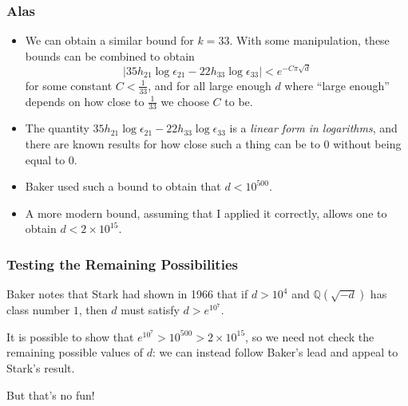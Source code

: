 \documentclass[handout]{beamer}
\begin{document}
\begin{frame}

	\frametitle{Alas}

	\begin{itemize}

		\item We can obtain a similar bound for $k = 33$. With some manipulation, these bounds can be combined to obtain
			\[
				\left| 35 h_{21} \log \epsilon_{21} - 22 h_{33} \log \epsilon_{33} \right| < e^{-C \pi \sqrt{d}}
			\]
			for some constant $C < \frac{1}{33}$, and for all large enough $d$ where ``large enough'' depends on how close to $\frac{1}{33}$ we choose $C$ to be.
			\pause

		\item The quantity $35 h_{21} \log \epsilon_{21} - 22 h_{33} \log \epsilon_{33}$ is a \emph{linear form in logarithms}, and there are known results for how close such a thing can be to $0$ without being equal to $0$. \pause

		\item Baker used such a bound to obtain that $d < 10^{500}$. \pause

		\item A more modern bound, assuming that I applied it correctly, allows one to obtain $d < 2 \times 10^{15}$.

	\end{itemize}

\end{frame}

\begin{frame}

	\frametitle{Testing the Remaining Possibilities}

	Baker notes that Stark had shown in 1966 that if $d > 10^4$ and $\mathbb{Q}(\sqrt{-d})$ has class number $1$, then $d$ must satisfy $d > e^{10^7}$. \pause

	It is possible to show that $e^{10^7} > 10^{500} > 2 \times 10^{15}$, so we need not check the remaining possible values of $d$: we can instead follow Baker's lead and appeal to Stark's result. \pause

	But that's no fun!

\end{frame}
\end{document}
